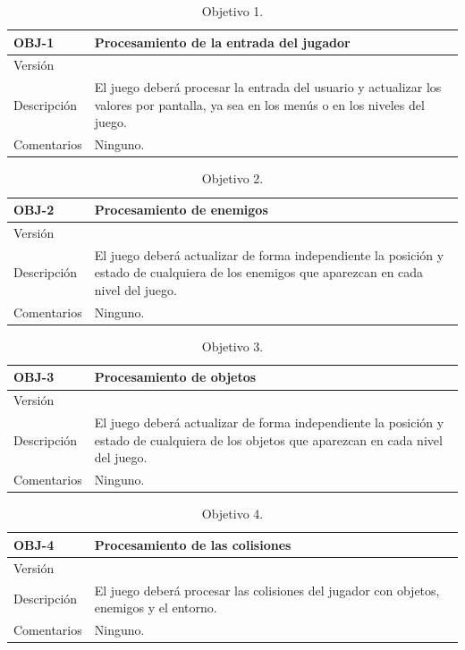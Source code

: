 \begin{table}[h]
	\centering
	\begin{tabular}{| l | p{12cm} |}
		\hline
		\textbf{OBJ-1} & \textbf{Procesamiento de la entrada del jugador}  \\ \hline
		Versión & \gameversion{}  \\ \hline
		Descripción & El juego deberá procesar la entrada del usuario y actualizar los valores por pantalla, ya sea en los menús o en los niveles del juego.  \\ \hline
		Comentarios & Ninguno.  \\ \hline
	\end{tabular}
	\caption{Objetivo 1.}\label{tab:obj_1}
\end{table}

\begin{table}[h]
	\centering
	\begin{tabular}{| l | p{12cm} |}
		\hline
		\textbf{OBJ-2} & \textbf{Procesamiento de enemigos}  \\ \hline
		Versión & \gameversion{}  \\ \hline
		Descripción & El juego deberá actualizar de forma independiente la posición y estado de cualquiera de los enemigos que aparezcan en cada nivel del juego. \\ \hline
		Comentarios & Ninguno.  \\ \hline
	\end{tabular}
	\caption{Objetivo 2.}\label{tab:obj_2}
\end{table}

\begin{table}[h]
	\centering
	\begin{tabular}{| l | p{12cm} |}
		\hline
		\textbf{OBJ-3} & \textbf{Procesamiento de objetos}  \\ \hline
		Versión & \gameversion{}  \\ \hline
		Descripción & El juego deberá actualizar de forma independiente la posición y estado de cualquiera de los objetos que aparezcan en cada nivel del juego.  \\ \hline
		Comentarios & Ninguno.  \\ \hline
	\end{tabular}
	\caption{Objetivo 3.}\label{tab:obj_3}
\end{table}

\begin{table}[h]
	\centering
	\begin{tabular}{| l | p{12cm} |}
		\hline
		\textbf{OBJ-4} & \textbf{Procesamiento de las colisiones}  \\ \hline
		Versión & \gameversion{} \\ \hline
		Descripción & El juego deberá procesar las colisiones del jugador con objetos, enemigos y el entorno.  \\ \hline
		Comentarios & Ninguno.  \\ \hline
	\end{tabular}
	\caption{Objetivo 4.}\label{tab:obj_4}
\end{table}

